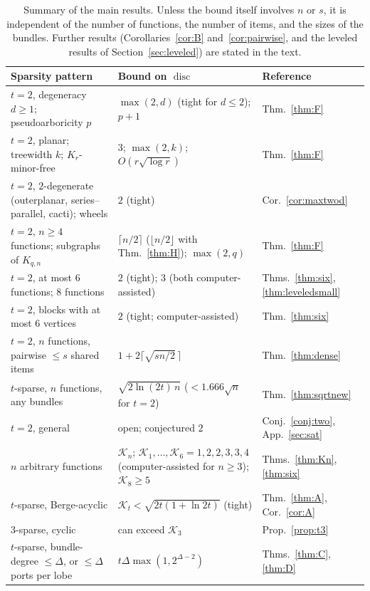 \documentclass[11pt,letterpaper]{article}
\theoremstyle{definition}
\DeclareMathOperator{\disc}{disc}
\begin{document}
\begin{table}[t]
\centering
\small
\begin{tabular}{@{}p{5.6cm}p{6.1cm}l@{}}
\toprule
Sparsity pattern & Bound on $\disc$ & Reference\\
\midrule
$t=2$, degeneracy $d\ge1$; pseudoarboricity $p$ & $\max(2,d)$ (tight for $d\le2$); $p+1$ & Thm.~\ref{thm:F}\\
$t=2$, planar; treewidth $k$; $K_r$-minor-free & $3$; $\max(2,k)$; $O(r\sqrt{\log r})$ & Thm.~\ref{thm:F}\\
$t=2$, $2$-degenerate (outerplanar, series--parallel, cacti); wheels & $2$ (tight) & Cor.~\ref{cor:maxtwod}\\
$t=2$, $n\ge4$ functions; subgraphs of $K_{q,n}$ & $\lceil n/2\rceil$ ($\lfloor n/2\rfloor$ with Thm.~\ref{thm:H}); $\max(2,q)$ & Thm.~\ref{thm:F}\\
$t=2$, at most $6$ functions; $8$ functions & $2$ (tight); $3$ (both computer-assisted) & Thms.~\ref{thm:six}, \ref{thm:leveledsmall}\\
$t=2$, blocks with at most $6$ vertices & $2$ (tight; computer-assisted) & Thm.~\ref{thm:six}\\
$t=2$, $n$ functions, pairwise $\le s$ shared items & $1+2\lceil\sqrt{sn/2}\,\rceil$ & Thm.~\ref{thm:dense}\\
$t$-sparse, $n$ functions, any bundles & $\sqrt{2\ln(2t)\,n}$ ($<1.666\sqrt n$ for $t=2$) & Thm.~\ref{thm:sqrtnew}\\
$t=2$, general & open; conjectured $2$ & Conj.~\ref{conj:two}, App.~\ref{sec:sat}\\
\midrule
$n$ arbitrary functions & $\mathcal{K}_n$; $\mathcal{K}_1,\dots,\mathcal{K}_6=1,2,2,3,3,4$ (computer-assisted for $n\ge3$); $\mathcal{K}_8\ge5$ &
Thms.~\ref{thm:Kn}, \ref{thm:six}\\
$t$-sparse, Berge-acyclic & $\mathcal{K}_t<\sqrt{2t(1+\ln 2t)}$ (tight) & Thm.~\ref{thm:A}, Cor.~\ref{cor:A}\\
$3$-sparse, cyclic & can exceed $\mathcal{K}_3$ & Prop.~\ref{prop:t3}\\
$t$-sparse, bundle-degree $\le\Delta$, or $\le\Delta$ ports per lobe & $t\Delta\max(1,2^{\Delta-2})$ & Thms.~\ref{thm:C}, \ref{thm:D}\\
\bottomrule
\end{tabular}
\caption{Summary of the main results. Unless the bound itself involves $n$ or $s$, it is independent of
the number of functions, the number of items, and the sizes of the bundles. Further results
(Corollaries~\ref{cor:B} and~\ref{cor:pairwise}, and the leveled results of Section~\ref{sec:leveled})
are stated in the text.}
\label{tab:summary}
\end{table}
\end{document}
